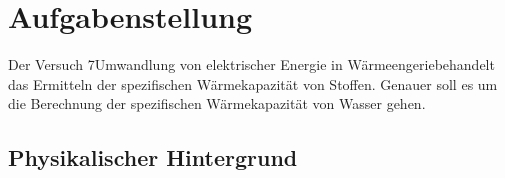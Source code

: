 \documentclass[10pt,a4paper]{article}
\newcommand{\vnr}{7}
\begin{document}
\newpage

\tableofcontents

\vspace{10pt}

\section{Aufgabenstellung}
\begin{flushleft}
Der Versuch \vnr \hspace{1pt}\glqq Umwandlung von elektrischer Energie in Wärmeengerie\grqq behandelt das Ermitteln der spezifischen Wärmekapazität von Stoffen. Genauer soll es um die Berechnung der spezifischen Wärmekapazität von Wasser gehen.
\end{flushleft}

\subsection{Physikalischer Hintergrund}
\end{document}
